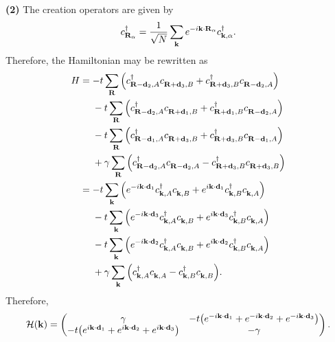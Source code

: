 \documentclass{article}
\makeatletter
\newcommand*{\shifttext}[1]{%
  \settowidth{\@tempdima}{#1}%
  \hspace{-\@tempdima}#1%
}
\newcommand{\plabel}[1]{%
\shifttext{\textbf{#1}\quad}%
}
\makeatother
\begin{document}
\plabel{(2)}%
The creation operators are given by
\[ c^\dagger_{\vb{R}_\alpha} = \frac{1}{\sqrt{N}} \sum_{\vb{k}} e^{-i\vb{k} \cdot \vb{R}_\alpha} c^\dagger_{\vb{k},\alpha}. \]
Therefore, the Hamiltonian may be rewritten as
\begin{align*}
  H &= -t \sum_{\vb{R}} \qty(c^\dagger_{\vb{R} - \vb{d}_2, A} c^{\vphantom{\dagger}}_{\vb{R} + \vb{d}_3, B} + c^\dagger_{\vb{R} + \vb{d}_3, B} c^{\vphantom{\dagger}}_{\vb{R} - \vb{d}_2, A}) \\
  &\phantom{{}={}} -t \sum_{\vb{R}} \qty(c^\dagger_{\vb{R} - \vb{d}_2, A} c^{\vphantom{\dagger}}_{\vb{R} + \vb{d}_1, B} + c^\dagger_{\vb{R} + \vb{d}_1, B} c^{\vphantom{\dagger}}_{\vb{R} - \vb{d}_2, A}) \\
  &\phantom{{}={}} -t \sum_{\vb{R}} \qty(c^\dagger_{\vb{R} - \vb{d}_1, A} c^{\vphantom{\dagger}}_{\vb{R} + \vb{d}_3, B} + c^\dagger_{\vb{R} + \vb{d}_3, B} c^{\vphantom{\dagger}}_{\vb{R} - \vb{d}_1, A}) \\
  &\phantom{{}={}} + \gamma \sum_{\vb{R}} \qty(c^\dagger_{\vb{R} - \vb{d}_2, A} c^{\vphantom{\dagger}}_{\vb{R} - \vb{d}_2, A} - c^\dagger_{\vb{R} + \vb{d}_3, B} c^{\vphantom{\dagger}}_{\vb{R} + \vb{d}_3, B}) \\
  &= -t \sum_{\vb{k}}\qty(e^{-i\vb{k}\cdot \vb{d}_1} c^\dagger_{\vb{k},A} c^{\vphantom{\dagger}}_{\vb{k}, B} + e^{i\vb{k}\cdot \vb{d}_1} c^\dagger_{\vb{k},B} c^{\vphantom{\dagger}}_{\vb{k}, A}) \\
  &\phantom{{}={}} -t \sum_{\vb{k}}\qty(e^{-i\vb{k}\cdot \vb{d}_3} c^\dagger_{\vb{k},A} c^{\vphantom{\dagger}}_{\vb{k}, B} + e^{i\vb{k}\cdot \vb{d}_3} c^\dagger_{\vb{k},B} c^{\vphantom{\dagger}}_{\vb{k}, A}) \\
  &\phantom{{}={}} -t \sum_{\vb{k}}\qty(e^{-i\vb{k}\cdot \vb{d}_2} c^\dagger_{\vb{k},A} c^{\vphantom{\dagger}}_{\vb{k}, B} + e^{i\vb{k}\cdot \vb{d}_2} c^\dagger_{\vb{k},B} c^{\vphantom{\dagger}}_{\vb{k}, A}) \\
  &\phantom{{}={}} + \gamma \sum_{\vb{k}} \qty(c^\dagger_{\vb{k},A} c^{\vphantom{\dagger}}_{\vb{k},A} - c^\dagger_{\vb{k}, B} c^{\vphantom{\dagger}}_{\vb{k}, B}).
\end{align*}
Therefore,
\begin{equation*}
  \mathcal{H}(\vb{k}) = \begin{pmatrix}
    \gamma & -t\qty(e^{-i\vb{k}\cdot \vb{d}_1} + e^{-i\vb{k}\cdot \vb{d}_2} + e^{-i\vb{k}\cdot \vb{d}_3}) \\
    -t\qty(e^{i\vb{k}\cdot \vb{d}_1} + e^{i\vb{k}\cdot \vb{d}_2} + e^{i\vb{k}\cdot \vb{d}_3}) & -\gamma
  \end{pmatrix}.
\end{equation*}
\end{document}
